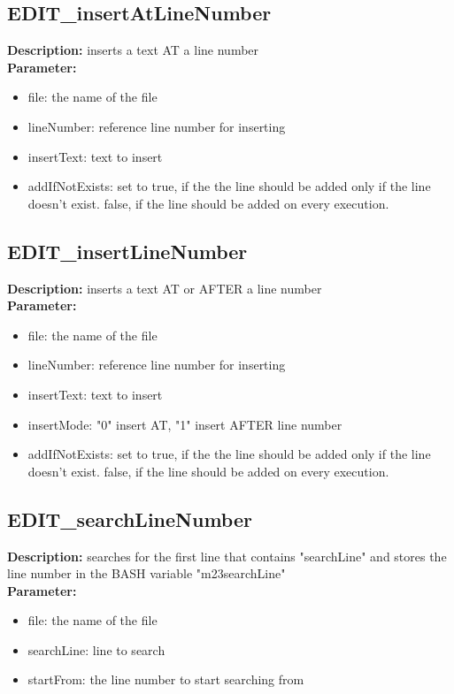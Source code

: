 \subsection{EDIT\_insertAtLineNumber}
\textbf{Description:} inserts a text AT a line number\\
\textbf{Parameter:}
\begin{itemize}
\item file: the name of the file
\item lineNumber: reference line number for inserting
\item insertText: text to insert
\item addIfNotExists: set to true, if the the line should be added only if the line doesn't exist. false, if the line should be added on every execution.
\end{itemize}

\subsection{EDIT\_insertLineNumber}
\textbf{Description:} inserts a text AT or AFTER a line number\\
\textbf{Parameter:}
\begin{itemize}
\item file: the name of the file
\item lineNumber: reference line number for inserting
\item insertText: text to insert
\item insertMode: "0" insert AT, "1" insert AFTER line number
\item addIfNotExists: set to true, if the the line should be added only if the line doesn't exist. false, if the line should be added on every execution.
\end{itemize}

\subsection{EDIT\_searchLineNumber}
\textbf{Description:} searches for the first line that contains "searchLine" and stores the line number in the BASH variable "m23searchLine"\\
\textbf{Parameter:}
\begin{itemize}
\item file: the name of the file
\item searchLine: line to search
\item startFrom: the line number to start searching from
\end{itemize}


